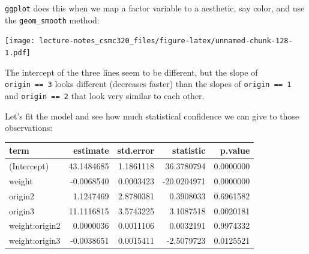 \documentclass[12pt,]{book}
\newenvironment{Shaded}{\begin{snugshade}}{\end{snugshade}}
\newcommand{\KeywordTok}[1]{\textcolor[rgb]{0.13,0.29,0.53}{\textbf{#1}}}
\newcommand{\DataTypeTok}[1]{\textcolor[rgb]{0.13,0.29,0.53}{#1}}
\newcommand{\StringTok}[1]{\textcolor[rgb]{0.31,0.60,0.02}{#1}}
\newcommand{\OperatorTok}[1]{\textcolor[rgb]{0.81,0.36,0.00}{\textbf{#1}}}
\newcommand{\NormalTok}[1]{#1}
\theoremstyle{definition}
\theoremstyle{definition}
\theoremstyle{definition}
\theoremstyle{remark}
\begin{document}
\texttt{ggplot} does this when we map a factor variable to a aesthetic,
say color, and use the \texttt{geom\_smooth} method:

\begin{Shaded}
\end{Shaded}

\texttt{[image: lecture-notes\_csmc320\_files/figure-latex/unnamed-chunk-128-1.pdf]}

The intercept of the three lines seem to be different, but the slope of
\texttt{origin\ ==\ 3} looks different (decreases faster) than the
slopes of \texttt{origin\ ==\ 1} and \texttt{origin\ ==\ 2} that look
very similar to each other.

Let's fit the model and see how much statistical confidence we can give
to those observations:

\begin{Shaded}
\end{Shaded}

\begin{tabular}{l|r|r|r|r}
\hline
term & estimate & std.error & statistic & p.value\\
\hline
(Intercept) & 43.1484685 & 1.1861118 & 36.3780794 & 0.0000000\\
\hline
weight & -0.0068540 & 0.0003423 & -20.0204971 & 0.0000000\\
\hline
origin2 & 1.1247469 & 2.8780381 & 0.3908033 & 0.6961582\\
\hline
origin3 & 11.1116815 & 3.5743225 & 3.1087518 & 0.0020181\\
\hline
weight:origin2 & 0.0000036 & 0.0011106 & 0.0032191 & 0.9974332\\
\hline
weight:origin3 & -0.0038651 & 0.0015411 & -2.5079723 & 0.0125521\\
\hline
\end{tabular}
\end{document}
